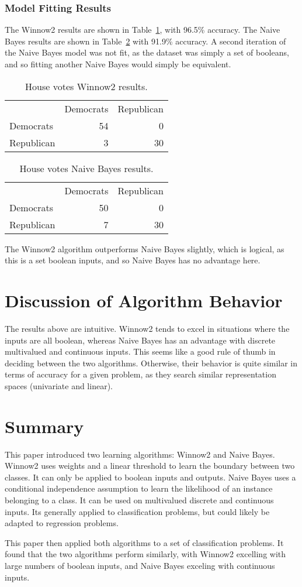 \documentclass{amsart}
\begin{document}
\subsubsection*{Model Fitting Results}
The Winnow2 results are shown in Table~\ref{winnow_congress}, with 96.5\% accuracy.
The Naive Bayes results are shown in Table~\ref{nb_congress} with 91.9\% accuracy.
A second iteration of the Naive Bayes model was not fit, as the dataset was simply a set of booleans, and so fitting another
Naive Bayes would simply be equivalent.
\begin{table}
\begin{tabular}{lrr}
{} &   Democrats &   Republican \\
Democrats &  54 &   0 \\
Republican &   3 &  30 \\
\end{tabular}
\label{winnow_congress}
\caption{House votes Winnow2 results.}
\end{table}

\begin{table}
\begin{tabular}{lrr}
{} &   Democrats &   Republican \\
Democrats &  50 &   0 \\
Republican &   7 &  30 \\
\end{tabular}
\label{nb_congress}
\caption{House votes Naive Bayes results.}
\end{table}

The Winnow2 algorithm outperforms Naive Bayes slightly, which is logical, as this is a set boolean inputs,
and so Naive Bayes has no advantage here.

\section{Discussion of Algorithm Behavior}
The results above are intuitive. Winnow2 tends to excel in situations where the inputs are all boolean, whereas
Naive Bayes has an advantage with discrete multivalued and continuous inputs. This seems like a good rule of thumb in
deciding between the two algorithms. Otherwise, their behavior is quite similar in terms of accuracy for a given problem,
as they search similar representation spaces (univariate and linear).

\section{Summary}
This paper introduced two learning algorithms: Winnow2 and Naive Bayes.
Winnow2 uses weights and a linear threshold to learn the boundary between two classes. It can only be applied
to boolean inputs and outputs. Naive Bayes uses a conditional independence assumption to learn the likelihood of an instance
belonging to a class. It can be used on multivalued discrete and continuous inputs. Its generally applied to classification problems,
but could likely be adapted to regression problems.

This paper then applied both algorithms to a set of classification problems. It found that the two algorithms perform similarly,
with Winnow2 excelling with large numbers of boolean inputs, and Naive Bayes exceling with continuous inputs.




\end{document}
